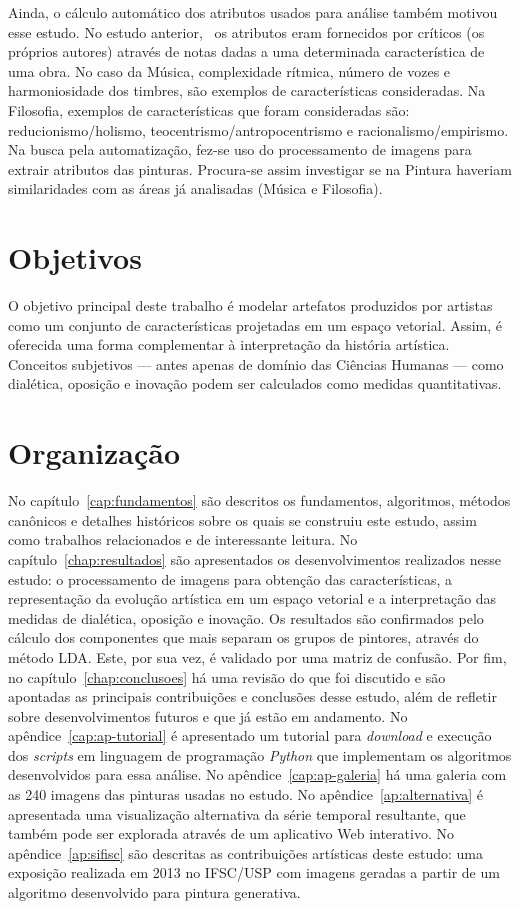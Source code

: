 Ainda, o cálculo automático dos atributos usados para análise também
motivou esse estudo. No estudo anterior,~\cite{vieira} os atributos
eram fornecidos por críticos (os próprios autores) através de notas
dadas a uma determinada característica de uma obra. No caso da Música,
complexidade rítmica, número de vozes e harmoniosidade dos timbres, são
exemplos de características consideradas. Na Filosofia, exemplos de
características que foram consideradas são: reducionismo/holismo,
teocentrismo/antropocentrismo e racionalismo/empirismo. Na busca pela
automatização, fez-se uso do processamento de imagens para extrair
atributos das pinturas. Procura-se assim investigar se na Pintura
haveriam similaridades com as áreas já analisadas (Música e
Filosofia).

\section{Objetivos}

O objetivo principal deste trabalho é modelar artefatos produzidos por
artistas como um conjunto de características projetadas em um espaço
vetorial. Assim, é oferecida uma forma complementar à interpretação da
história artística. Conceitos subjetivos --- antes apenas de domínio
das Ciências Humanas --- como dialética, oposição e inovação podem ser
calculados como medidas quantitativas.

\section{Organização}

No capítulo~\ref{cap:fundamentos} são descritos os fundamentos,
algoritmos, métodos canônicos e detalhes históricos sobre os quais se
construiu este estudo, assim como trabalhos relacionados e de
interessante leitura. No capítulo~\ref{chap:resultados} são apresentados os
desenvolvimentos realizados nesse estudo: o processamento de imagens
para obtenção das características, a representação da evolução
artística em um espaço vetorial e a interpretação das medidas de
dialética, oposição e inovação. Os resultados são confirmados pelo
cálculo dos componentes que mais separam os grupos de pintores,
através do método LDA. Este, por sua vez, é validado por uma matriz de
confusão. Por fim, no capítulo~\ref{chap:conclusoes} há uma revisão do
que foi discutido e são apontadas as principais contribuições e conclusões
desse estudo, além de refletir sobre desenvolvimentos futuros e que já
estão em andamento. No apêndice~\ref{cap:ap-tutorial} é apresentado um tutorial
para \textit{download} e execução dos \textit{scripts} em linguagem de
programação \textit{Python} que implementam os algoritmos
desenvolvidos para essa análise. No apêndice~\ref{cap:ap-galeria} há uma galeria com as
240 imagens das pinturas usadas no estudo. No apêndice~\ref{ap:alternativa} é apresentada
uma visualização alternativa da série temporal resultante, que também
pode ser explorada através de um aplicativo Web interativo. No apêndice~\ref{ap:sifisc} são descritas as contribuições artísticas deste estudo: uma exposição
realizada em 2013 no IFSC/USP com imagens geradas a partir de um
algoritmo desenvolvido para pintura generativa.

